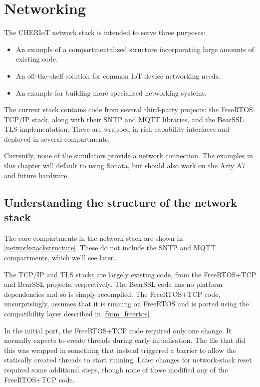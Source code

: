 \chapter{Networking}

The CHERIoT network stack is intended to serve three purposes:

\begin{itemize}
	\item{An example of a compartmentalized structure incorporating large amounts of existing code.}
	\item{An off-the-shelf solution for common IoT device networking needs.}
	\item{An example for building more specialised networking systems.}
\end{itemize}

The current stack contains code from several third-party projects: the FreeRTOS TCP/IP stack, along with their SNTP and MQTT libraries, and the BearSSL TLS implementation.
These are wrapped in rich capability interfaces and deployed in several compartments.

\begin{note}
Currently, none of the simulators provide a network connection.
The examples in this chapter will default to using Sonata, but should also work on the Arty A7 and future hardware.
\end{note}

\section{Understanding the structure of the network stack}

The core compartments in the network stack are shown in \ref{networkstackstructure}.
These do not include the SNTP and MQTT compartments, which we'll see later.


The TCP/IP and TLS stacks are largely existing code, from the FreeRTOS+TCP and BearSSL projects, respectively.
The BearSSL code has no platform dependencies and so is simply recompiled.
The FreeRTOS+TCP code, unsurprisingly, assumes that it is running on FreeRTOS and is ported using the compatibility layer described in \ref{from_freertos}.

In the initial port, the FreeRTOS+TCP code required only one change.
It normally expects to create threads during early initialisation.
The file that did this was wrapped in something that instead triggered a barrier to allow the statically created threads to start running.
Later changes for network-stack reset required some additional steps, though none of these modified any of the FreeRTOS+TCP code.

